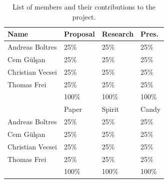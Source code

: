 \documentclass[10pt,twocolumn,letterpaper]{article}
\begin{document}
\begin{table}[H]
\centering
\begin{tabular}{l|l l l} \hline
		Name & Proposal & Research & Pres.\\ \hline
		Andreas Boltres & 25\% & 25\% & 25\% \\
		Cem G\"ul\c{s}an & 25\% & 25\% & 25\% \\
		Christian Vecsei & 25\% & 25\% & 25\% \\
		Thomas Frei & 25\% & 25\% & 25\%  \\ \hline
		& 100\% & 100\% & 100\% \\ \hline \hline
		     & Paper & Spirit & Candy\\ \hline
		Andreas Boltres & 25\% & 25\% & 25\% \\
		Cem G\"ul\c{s}an & 25\% & 25\% & 25\% \\
		Christian Vecsei & 25\% & 25\% & 25\% \\
		Thomas Frei & 25\% & 25\% & 25\% \\ \hline
		& 100\% & 100\% & 100\% \\ \hline
\end{tabular}
\caption{List of members and their contributions to the project.}
\label{tab:contrib}
\end{table}
\end{document}
